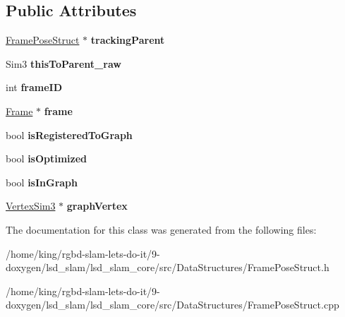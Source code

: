 \subsection*{Public Attributes}
\begin{DoxyCompactItemize}
\item 
\hypertarget{classlsd__slam_1_1_frame_pose_struct_a8400a2c52d604df957e0e9bac5617694}{\hyperlink{classlsd__slam_1_1_frame_pose_struct}{Frame\-Pose\-Struct} $\ast$ {\bfseries tracking\-Parent}}\label{classlsd__slam_1_1_frame_pose_struct_a8400a2c52d604df957e0e9bac5617694}

\item 
\hypertarget{classlsd__slam_1_1_frame_pose_struct_acf840ddb08df60aa537c52b305430a2a}{Sim3 {\bfseries this\-To\-Parent\-\_\-raw}}\label{classlsd__slam_1_1_frame_pose_struct_acf840ddb08df60aa537c52b305430a2a}

\item 
\hypertarget{classlsd__slam_1_1_frame_pose_struct_a539963b1638c4b6a4f6d193001a9b94a}{int {\bfseries frame\-I\-D}}\label{classlsd__slam_1_1_frame_pose_struct_a539963b1638c4b6a4f6d193001a9b94a}

\item 
\hypertarget{classlsd__slam_1_1_frame_pose_struct_a63504ec171fc92efa6b265e044c09542}{\hyperlink{classlsd__slam_1_1_frame}{Frame} $\ast$ {\bfseries frame}}\label{classlsd__slam_1_1_frame_pose_struct_a63504ec171fc92efa6b265e044c09542}

\item 
\hypertarget{classlsd__slam_1_1_frame_pose_struct_a7d41681d66aefd365ba9266742f2249f}{bool {\bfseries is\-Registered\-To\-Graph}}\label{classlsd__slam_1_1_frame_pose_struct_a7d41681d66aefd365ba9266742f2249f}

\item 
\hypertarget{classlsd__slam_1_1_frame_pose_struct_af6fc2b6183b0e68b698a4d75f97b8a9d}{bool {\bfseries is\-Optimized}}\label{classlsd__slam_1_1_frame_pose_struct_af6fc2b6183b0e68b698a4d75f97b8a9d}

\item 
\hypertarget{classlsd__slam_1_1_frame_pose_struct_aea53c1fd0bb7038a8338f70d131172ad}{bool {\bfseries is\-In\-Graph}}\label{classlsd__slam_1_1_frame_pose_struct_aea53c1fd0bb7038a8338f70d131172ad}

\item 
\hypertarget{classlsd__slam_1_1_frame_pose_struct_a0a0ed0521f632f87c7cadc6f7583e985}{\hyperlink{classlsd__slam_1_1_vertex_sim3}{Vertex\-Sim3} $\ast$ {\bfseries graph\-Vertex}}\label{classlsd__slam_1_1_frame_pose_struct_a0a0ed0521f632f87c7cadc6f7583e985}

\end{DoxyCompactItemize}


The documentation for this class was generated from the following files\-:\begin{DoxyCompactItemize}
\item 
/home/king/rgbd-\/slam-\/lets-\/do-\/it/9-\/doxygen/lsd\-\_\-slam/lsd\-\_\-slam\-\_\-core/src/\-Data\-Structures/Frame\-Pose\-Struct.\-h\item 
/home/king/rgbd-\/slam-\/lets-\/do-\/it/9-\/doxygen/lsd\-\_\-slam/lsd\-\_\-slam\-\_\-core/src/\-Data\-Structures/Frame\-Pose\-Struct.\-cpp\end{DoxyCompactItemize}
